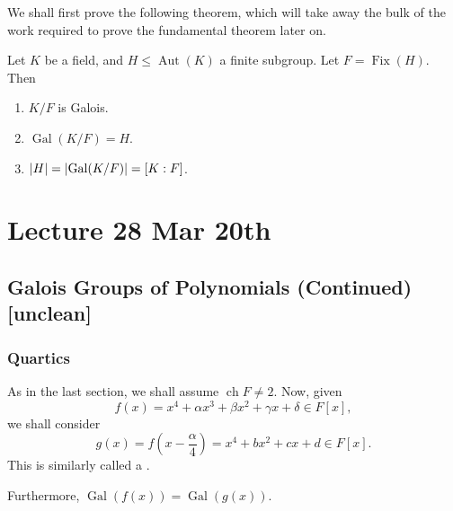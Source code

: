 \documentclass[notoc,notitlepage]{tufte-book}
\DeclareMathOperator{\Aut}{Aut}
\DeclareMathOperator{\Gal}{Gal}
\DeclareMathOperator{\Fix}{Fix}
\DeclareMathOperator{\ch}{ch}
\begin{document}
We shall first prove the following theorem, which will take away the bulk of the
work required to prove the fundamental theorem later on.

\begin{thm}\label{thm:artin_s_theorem}
  Let $K$ be a field, and $H \leq \Aut(K)$ a finite subgroup. Let $F = \Fix(H)$.
  Then
  \begin{enumerate}
    \item $K / F$ is Galois.
    \item $\Gal(K / F) = H$.
    \item $\abs{H} = \abs{\Gal(K / F)} = [K : F]$.
  \end{enumerate}
\end{thm}



\chapter{Lecture 28 Mar 20th}%
\label{chp:lecture_28_mar_20th}

\section{Galois Groups of Polynomials (Continued) [unclean]}%
\label{sec:galois_groups_of_polynomials_continued}

\subsection{Quartics}%
\label{sub:quartics}

As in the last section, we shall assume $\ch F \neq 2$. Now, given
\begin{equation*}
  f(x) = x^4 + \alpha x^3 + \beta x^2 + \gamma x + \delta \in F[x],
\end{equation*}
we shall consider
\begin{equation*}
  g(x) = f\left(x - \frac{\alpha}{4}\right) = x^4 + bx^2 + cx + d \in F[x].
\end{equation*}
This is similarly called a .

Furthermore, $\Gal(f(x)) = \Gal(g(x))$. 
\end{document}
